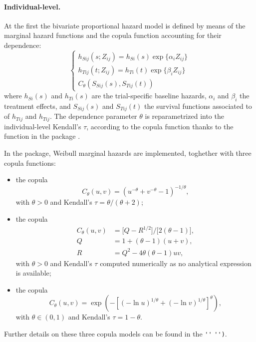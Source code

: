 \documentclass[article,shortnames, nojss]{jss}\usepackage[]{graphicx}\usepackage[]{color}
\begin{document}
\paragraph{Individual-level.}
At the first the bivariate proportional hazard model is defined
by means of the marginal hazard functions and the copula function
accounting for their dependence:
\begin{equation}
\begin{cases}
h_{Sij}(s; Z_{ij}) = h_{Si}(s) \exp\big\{
\alpha_i Z_{ij} 
\big\}\\
h_{Tij}(t; Z_{ij}) = h_{Ti}(t) \exp\big\{
\beta_i Z_{ij}
\big\}\\
C_\theta(S_{Sij}(s), S_{Tij}(t))
\end{cases}
\label{eq:copulaModel}
\end{equation}
where $h_{Si}(s)$ and $h_{Ti}(s)$ are the trial-specific baseline hazards,
$\alpha_i$ and $\beta_i$ the treatment effects,
and $S_{Sij}(s)$ and $S_{Tij}(t)$ the survival functions associated to
of $h_{Tij}$ and $h_{Tij}$.
The dependence parameter $\theta$
is reparametrized into the individual-level Kendall's $\tau$,
according to the copula function
thanks to the  function in the 
 package \citep{R:copula, Yan07}.

In the  package,
Weibull marginal hazards are implemented, toghether with three copula functions:
\begin{itemize}
\item the \cite{Clayton78} copula
\begin{equation}
C_\theta(u, v)= \left(u^{-\theta} + v^{-\theta} - 1\right)^{-1/\theta},
\label{eq:clayton}
\end{equation}
with $\theta > 0$
and Kendall's $\tau = \theta/(\theta+2)$;
\item the \cite{Plackett65} copula
\begin{align}
C_\theta(u,v) &= \big[ Q - R^{1/2} \big] / \big[2 (\theta - 1) \big],\\
Q &= 1 +(\theta-1)(u+v), \nonumber\\
R &= Q^2 - 4 \theta(\theta-1)uv, \nonumber
\end{align}
with $\theta > 0$ and Kendall's $\tau$ computed numerically
as no analytical expression is available;
\item the \cite{Hougaard86} copula
\begin{equation}
C_\theta(u,v)= \exp\left(-\left[(- \ln u)^{1/\theta} +
(- \ln v)^{1/\theta}\right]^\theta \right),
\end{equation}
with $\theta \in (0, 1)$ 
and Kendall's $\tau = 1 - \theta$.
\end{itemize}
Further details on these three copula models can be found in the 
\verb|'|\verb|'|
\verb|'|\verb|')|.
\end{document}
